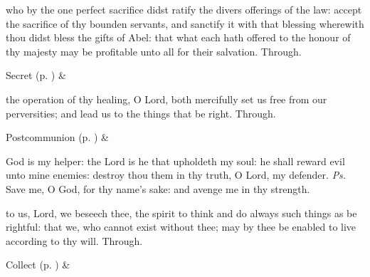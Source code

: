 
\secret
{} who by the one perfect sacrifice didst ratify the divers offerings of the law: accept the sacrifice of thy bounden servants, and sanctify it with that blessing wherewith thou didst bless the gifts of Abel: that what each hath offered to the honour of thy majesty may be profitable unto all for their salvation. Through.
\begin{rubric}
     Secret  (p. \pageref{SPSaints}) \&  
\end{rubric}


\postcommunion
{} the operation of thy healing, O Lord, both mercifully set us free from our perversities; and lead us to the things that be right. Through.


\begin{rubric}
     Postcommunion  (p. \pageref{SPSaints}) \&  
\end{rubric}


\clearpage
{}


\vspace{-0.75\baselineskip}

\introit
{} God is my helper: the Lord is he that upholdeth my soul: he shall reward evil unto mine enemies: destroy thou them in thy truth, O Lord, my defender. \textit{Ps.} Save me, O God, for thy name's sake: and avenge me in thy strength.

\vspace{-1\baselineskip}

\collect
{} to us, Lord, we beseech thee, the spirit to think and do always such things as be rightful: that we, who cannot exist without thee; may by thee be enabled to live according to thy will. Through.
\begin{rubric}
     Collect  (p. \pageref{SPSaints}) \&  
\end{rubric}

